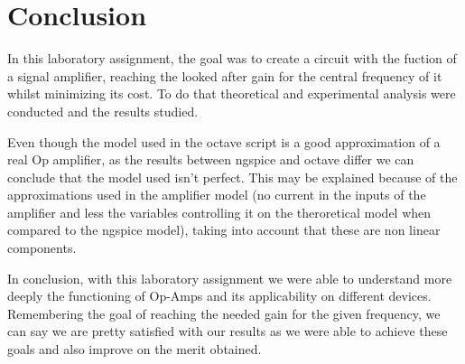 \section{Conclusion}
\label{sec:conclusion}


\par In this laboratory assignment, the goal was to create a circuit with the fuction of a signal amplifier, reaching the looked after gain for the central frequency of it whilst minimizing its cost. To do that theoretical and experimental analysis were conducted and the results studied.

\par Even though the model used in the octave script is a good approximation of a real Op amplifier, as the results between ngspice and octave differ  we can conclude that the model used isn't perfect. This may be explained because of the approximations used in the amplifier model (no current in the inputs of the amplifier and less the variables controlling it on the theroretical model when compared to the ngspice model), taking into account that these are non linear components. 
 
\par In conclusion, with this laboratory assignment we were able to understand more deeply the functioning of Op-Amps and its applicability on different devices. Remembering the goal of reaching the needed gain for the given frequency, we can say we are pretty satisfied with our results as we were able to achieve these goals and also improve on the merit obtained.







